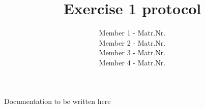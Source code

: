\documentclass[10pt,a4paper]{article}
\title{Exercise 1 protocol}
\author{Member 1 - Matr.Nr. \\
Member 2 - Matr.Nr. \\
Member 3 - Matr.Nr. \\
Member 4 - Matr.Nr.}
\begin{document}
	\maketitle
	Documentation to be written here
\end{document}
